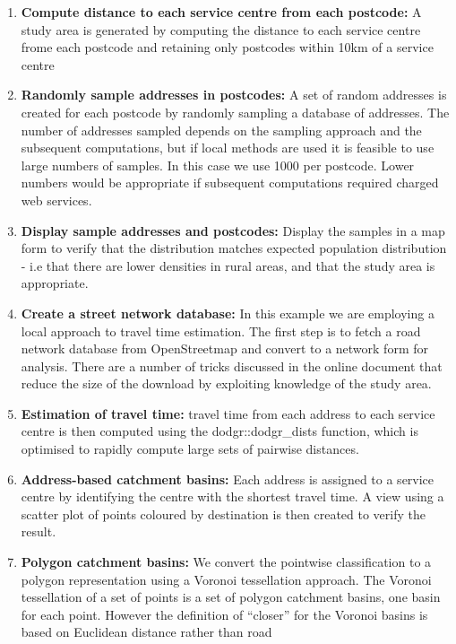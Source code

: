\documentclass[utf8]{frontiersHLTH}
\begin{document}
\begin{enumerate}
  \def\labelenumi{\arabic{enumi}.}
  \setcounter{enumi}{3}
\item
  {\bf Compute distance to each service centre from each postcode:} A study
  area is generated by computing the distance to each service centre
  frome each postcode and retaining only postcodes within 10km of a
  service centre
\item
 {\bf Randomly sample addresses in postcodes:} A set of random addresses is created for each
  postcode by randomly sampling a database of addresses. The number of
  addresses sampled depends on the sampling approach and the subsequent
  computations, but if local methods are used it is feasible to use
  large numbers of samples. In this case we use 1000 per postcode. Lower
  numbers would be appropriate if subsequent computations required
  charged web services.
\item
  {\bf Display sample addresses and postcodes:} Display the samples in a map
  form to verify that the distribution matches expected population
  distribution - i.e that there are lower densities in rural areas, and
  that the study area is appropriate.
\item
  {\bf Create a street network database:} In this example we are employing a
  local approach to travel time estimation. The first step is to fetch a
  road network database from OpenStreetmap and convert to a network form
  for analysis. There are a number of tricks discussed in the online
  document that reduce the size of the download by exploiting knowledge
  of the study area.
\item
  {\bf Estimation of travel time:} travel time from each address to each
  service centre is then computed using the dodgr::dodgr\_dists
  function, which is optimised to rapidly compute large sets of pairwise
  distances.
\item
  {\bf Address-based catchment basins:} Each address is assigned to a service
  centre by identifying the centre with the shortest travel time. A view
  using a scatter plot of points coloured by destination is then created
  to verify the result.
\item
  {\bf Polygon catchment basins:} We convert the pointwise classification to a
  polygon representation using a Voronoi tessellation approach. The
  Voronoi tessellation of a set of points is a set of polygon catchment
  basins, one basin for each point. However the definition of ``closer''
  for the Voronoi basins is based on Euclidean distance rather than road

\end{enumerate}
\end{document}
